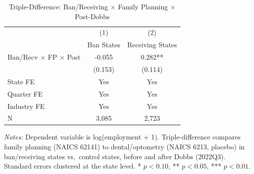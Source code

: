 \begin{table}[H]
\centering
\caption{Triple-Difference: Ban/Receiving $\times$ Family Planning $\times$ Post-Dobbs}
\label{tab:ddd}
\begin{threeparttable}
\begin{tabular}{lcc}
\toprule
 & (1) & (2) \\
 & Ban States & Receiving States \\
\midrule
Ban/Recv $\times$ FP $\times$ Post & -0.055 & 0.282** \\
 & (0.153) & (0.114) \\
\midrule
State FE & Yes & Yes \\
Quarter FE & Yes & Yes \\
Industry FE & Yes & Yes \\
N & 3,085 & 2,723 \\
\bottomrule
\end{tabular}
\begin{tablenotes}[flushleft]
\small
\item \textit{Notes:} Dependent variable is log(employment $+$ 1). Triple-difference compares family planning (NAICS 62141) to dental/optometry (NAICS 6213, placebo) in ban/receiving states vs.\ control states, before and after Dobbs (2022Q3). Standard errors clustered at the state level. * $p<0.10$, ** $p<0.05$, *** $p<0.01$.
\end{tablenotes}
\end{threeparttable}
\end{table}

